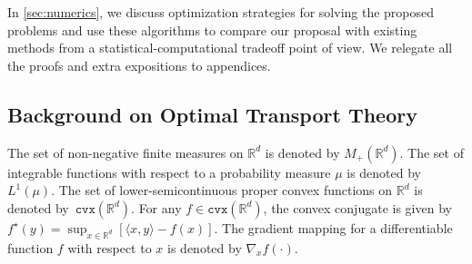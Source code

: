 \documentclass[10pt]{article}
\newcommand{\cvx}{\mathtt{cvx}}
\newcommand{\real}{\mathbb{R}}
\numberwithin{equation}{section}
\begin{document}
In \autoref{sec:numerics}, we discuss optimization strategies for solving the proposed problems and use these algorithms to compare our proposal with existing methods from a statistical-computational tradeoff point of view. We relegate all the proofs and extra expositions to appendices. 


\subsection{Background on Optimal Transport Theory}\label{sec:background-OT}
The set of non-negative finite measures on $\real^d$ is denoted by $M_+(\real^d)$. 
The set of integrable functions with respect to a probability measure $\mu$ is denoted by $L^1(\mu)$. 
The set of lower-semicontinuous proper convex functions on $\real^d$ is denoted by~$\cvx(\real^d)$. 
For any $f \in \cvx(\real^d)$, the convex conjugate is given by $f^\star(y)=\sup_{x \in \real^d} \left[\langle x, y\rangle - f(x)\right]$. 
The gradient mapping for a differentiable function $f$ with respect to $x$ is denoted by $\nabla_x f(\cdot)$.
\end{document}

